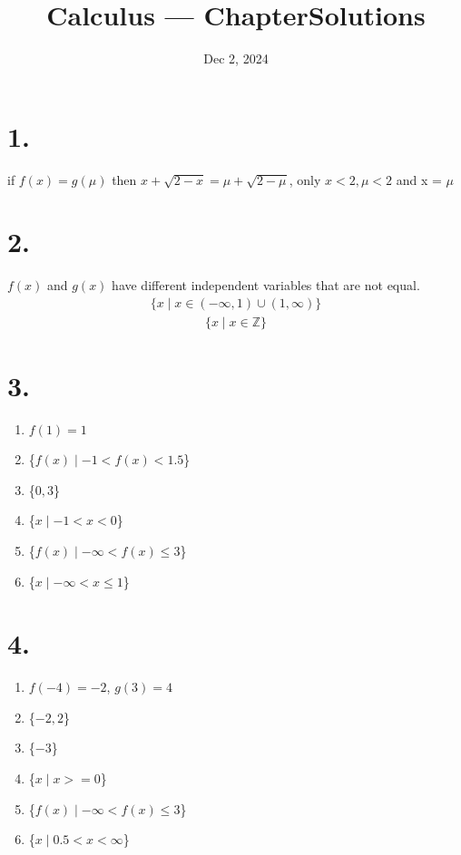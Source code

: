 \documentclass[11pt]{article}
\title{Calculus --- Chapter\Homework Solutions}
\author{\Name}
\date{Dec 2, 2024}
\newenvironment{qparts}{\begin{enumerate}[{(}a{)}]}{\end{enumerate}}
\begin{document}
\maketitle


\section*{1.}
if $f(x) = g(\mu)$ then $x + \sqrt{2 - x} = \mu + \sqrt{2 - \mu}$, only $x < 2, \mu < 2$ and x = $\mu$


\section*{2.}
$f(x)$ and $g(x)$ have different independent variables that are not equal.
\begin{align}
    \{ x \mid x \in (-\infty, 1) \cup (1, \infty) \}
\end{align}
\begin{align}
    \{ x \mid x \in \mathbb{Z} \}
\end{align}


\section*{3.}
\begin{qparts}
 \item $f(1) = 1$
 \item \{$f(x) \mid -1 < f(x) < 1.5$\}
 \item \{$0,3$\}
 \item \{$x \mid -1 < x < 0$\}
 \item \{$f(x) \mid -\infty < f(x) \leq 3$\}
 \item \{$x \mid -\infty < x \leq 1$\}
\end{qparts}


\section*{4.}
\begin{qparts}
    \item $f(-4) = -2$, $g(3) = 4$
    \item \{$-2, 2$\}
    \item \{$-3$\}
    \item \{$x \mid x >= 0$\}
    \item \{$f(x) \mid -\infty < f(x) \leq 3$\}
    \item \{$x \mid 0.5 < x < \infty $\}
\end{qparts}
\end{document}
